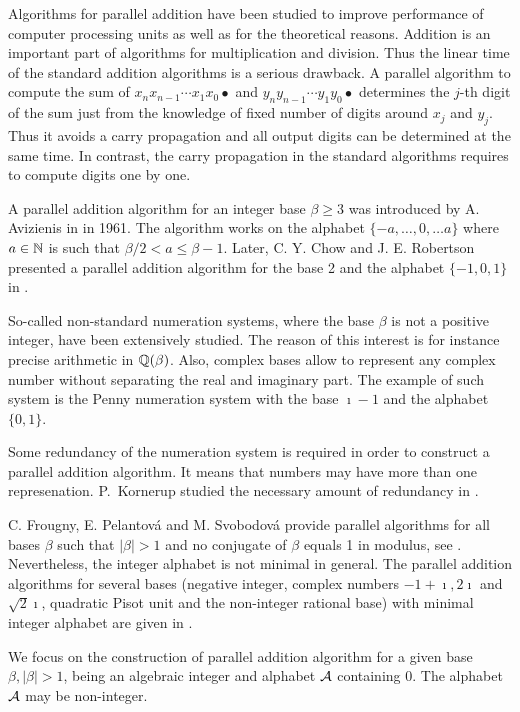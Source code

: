 Algorithms for parallel addition have been studied to improve performance of computer processing units as well as for the theoretical reasons. Addition is an important part of algorithms for multiplication and division. Thus the linear time of the standard addition algorithms is a serious drawback. A parallel algorithm to compute the sum of $x_n x_{n-1}\cdots x_1 x_0 \bullet$ and $y_n y_{n-1}\cdots y_1 y_0 \bullet$ determines the $j$-th digit of the sum just from the knowledge of fixed number of digits around $x_j$ and $y_j$. Thus it avoids a carry propagation and all output digits can be determined at the same time. In contrast, the carry propagation in the standard algorithms requires to compute digits one by one.

A parallel addition algorithm for an integer base $\beta\geq3$ was introduced by A. Avizienis in \cite{avizienis} in 1961. The algorithm works on the alphabet $\{-a, \dots, 0, \dots a\}$ where $a\in\mathbb{N}$ is such that $\beta/2 <a \leq \beta-1$. Later, C. Y. Chow and J. E. Robertson presented a parallel addition algorithm for the base 2 and the alphabet $\{-1,0,1\}$ in \cite{chow}.   

So-called non-standard numeration systems, where the base $\beta$ is not a positive integer, have been extensively studied. The reason of this interest is for instance precise arithmetic in $\mathbb{Q}(\beta)$. Also, complex bases allow to represent any complex number without separating the real and imaginary part. The example of such system is the Penny numeration system with the base $\imath -1$ and the alphabet $\{0,1\}$.

Some redundancy of the numeration system is required in order to construct a parallel addition algorithm. It means that numbers may have more than one represenation. P.~Kornerup studied the necessary amount of redundancy in \cite{kornerup}. 

C. Frougny, E. Pelantov\'a and M. Svobodov\'a provide parallel algorithms for all bases $\beta$ such that $|\beta|>1$ and no conjugate of $\beta$ equals 1 in modulus, see \cite{parAddNS}. Nevertheless, the integer alphabet is not minimal in general.
 The parallel addition algorithms for several bases (negative integer, complex numbers $-1+\imath, 2\imath$ and $\sqrt{2}\imath$, quadratic Pisot unit and the non-integer rational base) with minimal integer alphabet are given in \cite{minAlph}.
 

We focus on the construction of parallel addition algorithm for a given base $\beta, |\beta|>1$, being an algebraic integer and alphabet $\mathcal{A}$ containing 0. The alphabet $\mathcal{A}$ may be non-integer. 

